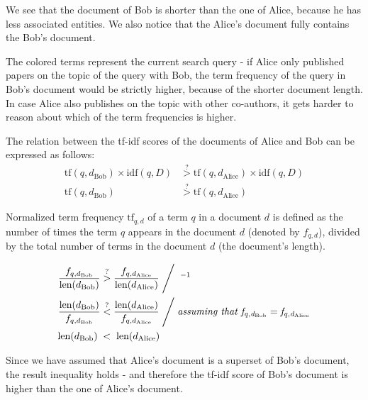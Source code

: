 We see that the document of Bob is shorter than the one of Alice, because he has less associated entities. We also notice that the Alice's document fully contains the Bob's document.
    
The colored terms represent the current search query - if Alice only published papers on the topic of the query with Bob, the term frequency of the 
query in Bob's document would be strictly higher, because of the shorter document length.
In case Alice also publishes on the topic with other co-authors, it gets harder to reason about which of the term frequencies is higher.

The relation between the tf-idf scores of the documents of Alice and Bob can be expressed as follows:
\begin{subequations}
\begin{align}
\text{tf}(q, d_{\text{Bob}}) \times \text{idf}(q, D) &\stackrel{?}{>} \text{tf}(q, d_{\text{Alice}}) \times \text{idf}(q, D) \\
\text{tf}(q, d_{\text{Bob}}) &\stackrel{?}{>} \text{tf}(q, d_{\text{Alice}})
\end{align}
\end{subequations}

Normalized term frequency $\text{tf}_{q,d}$ of a term $q$ in a document $d$ is defined as the number of times the term $q$ appears in the document $d$ (denoted by $f_{q,d}$),
divided by the total number of terms in the document $d$ (the document's length).

\begin{subequations}
\begin{align}
\frac{f_{q, d_{\text{Bob}}}}{\text{len}(d_{\text{Bob}})} &\stackrel{?}{>} \frac{f_{q, d_{\text{Alice}}}}{\text{len}(d_{\text{Alice}})} \Biggm/ \;^{-1} \\
\frac{\text{len}(d_{\text{Bob}})}{f_{q, d_{\text{Bob}}}} &\stackrel{?}{<} \frac{\text{len}(d_{\text{Alice}})}{f_{q, d_{\text{Alice}}}} \Biggm/ \textit{assuming that } \mathit{f_{q, d_{\text{Bob}}} = f_{q, d_{\text{Alice}}}} \label{eq:51assumption}\\
\text{len}(d_{\text{Bob}}) \;&<\;\text{len}(d_{\text{Alice}})
\end{align}
\end{subequations}

Since we have assumed that Alice's document is a superset of Bob's document, the result inequality holds - and therefore the tf-idf score of Bob's document is higher than the one of Alice's document.

